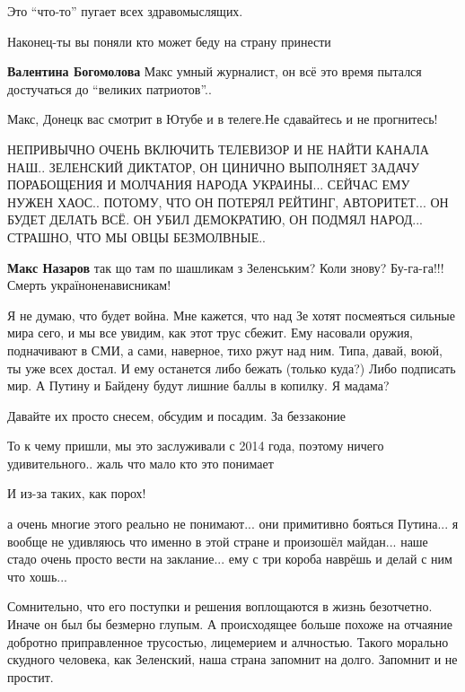 \begin{itemize}
Это \enquote{что-то} пугает всех здравомыслящих.

Наконец-ты вы поняли кто может беду на страну принести

\begin{itemize} %
\textbf{Валентина Богомолова} Макс умный журналист, он всё это время пытался достучаться до \enquote{великих патриотов}..

Макс, Донецк вас смотрит в Ютубе и в телеге.Не сдавайтесь и не прогнитесь!
\end{itemize} %


НЕПРИВЫЧНО ОЧЕНЬ ВКЛЮЧИТЬ ТЕЛЕВИЗОР И НЕ НАЙТИ КАНАЛА НАШ.. ЗЕЛЕНСКИЙ
ДИКТАТОР, ОН ЦИНИЧНО ВЫПОЛНЯЕТ ЗАДАЧУ ПОРАБОЩЕНИЯ И МОЛЧАНИЯ НАРОДА
УКРАИНЫ... СЕЙЧАС ЕМУ НУЖЕН ХАОС.. ПОТОМУ, ЧТО ОН ПОТЕРЯЛ РЕЙТИНГ, АВТОРИТЕТ... ОН
БУДЕТ ДЕЛАТЬ ВСЁ. ОН УБИЛ ДЕМОКРАТИЮ, ОН ПОДМЯЛ НАРОД... СТРАШНО, ЧТО МЫ ОВЦЫ
БЕЗМОЛВНЫЕ..

\textbf{Макс Назаров} так що там по шашликам з Зеленським? Коли знову? Бу-га-га!!! Смерть україноненависникам!


Я не думаю, что будет война. Мне кажется, что над Зе хотят посмеяться сильные
мира сего, и мы все увидим, как этот трус сбежит. Ему насовали оружия,
подначивают в СМИ, а сами, наверное, тихо ржут над ним. Типа, давай, воюй, ты
уже всех достал. И ему останется либо бежать (только куда?) Либо подписать мир.
А Путину и Байдену будут лишние баллы в копилку. Я мадама?

Давайте их просто снесем, обсудим и посадим. За беззаконие

То к чему пришли, мы это заслуживали с 2014 года, поэтому ничего удивительного.. жаль что мало кто это понимает

И из-за таких, как порох!


а очень многие этого реально не понимают... они примитивно бояться Путина... я
вообще не удивляюсь что именно в этой стране и произошёл майдан... наше стадо
очень просто вести на заклание... ему с три короба наврёшь и делай с ним что
хошь...


Сомнительно, что его поступки и решения воплощаются в жизнь безотчетно. Иначе
он был бы безмерно глупым. А происходящее больше похоже на отчаяние добротно
приправленное трусостью, лицемерием и алчностью. Такого морально скудного
человека, как Зеленский, наша страна запомнит на долго. Запомнит и не простит.


\end{itemize}
